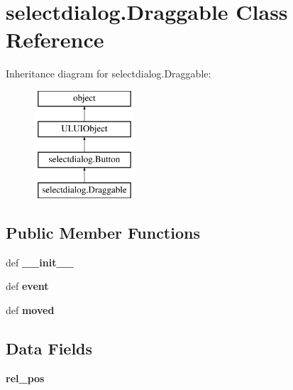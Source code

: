 \hypertarget{classselectdialog_1_1Draggable}{\section{selectdialog.\-Draggable Class Reference}
\label{classselectdialog_1_1Draggable}
}
Inheritance diagram for selectdialog.\-Draggable\-:\begin{figure}[H]
\begin{center}
\leavevmode
\includegraphics[height=4.000000cm]{classselectdialog_1_1Draggable}
\end{center}
\end{figure}
\subsection*{Public Member Functions}
\begin{DoxyCompactItemize}
\item 
\hypertarget{classselectdialog_1_1Draggable_a14f0264288ffaa5cf10115ffe20d6699}{def {\bfseries \-\_\-\-\_\-init\-\_\-\-\_\-}}\label{classselectdialog_1_1Draggable_a14f0264288ffaa5cf10115ffe20d6699}

\item 
\hypertarget{classselectdialog_1_1Draggable_ac6f8a0e33f1b96ba9336700a6d62c253}{def {\bfseries event}}\label{classselectdialog_1_1Draggable_ac6f8a0e33f1b96ba9336700a6d62c253}

\item 
\hypertarget{classselectdialog_1_1Draggable_ac1be90930ab822e816673a7a0dee83ff}{def {\bfseries moved}}\label{classselectdialog_1_1Draggable_ac1be90930ab822e816673a7a0dee83ff}

\end{DoxyCompactItemize}
\subsection*{Data Fields}
\begin{DoxyCompactItemize}
\item 
\hypertarget{classselectdialog_1_1Draggable_a701b7f8420093acfc4d14e13fd7ce32b}{{\bfseries rel\-\_\-pos}}\label{classselectdialog_1_1Draggable_a701b7f8420093acfc4d14e13fd7ce32b}

\end{DoxyCompactItemize}
